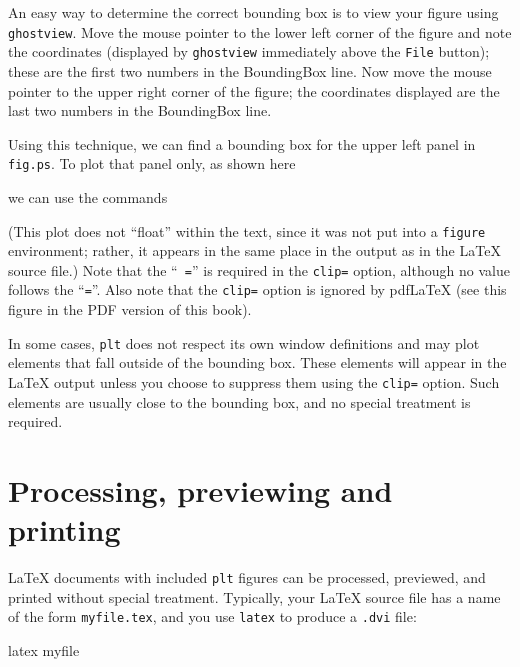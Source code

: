 \documentclass{book}
\begin{document}
%
An easy way to determine the correct bounding box is to view your figure using
{\tt ghostview}.  Move the mouse pointer to the lower left corner of the figure
and note the coordinates (displayed by {\tt ghostview} immediately above the
{\tt File} button); these are the first two numbers in the BoundingBox line.
Now move the mouse pointer to the upper right corner of the figure; the
coordinates displayed are the last two numbers in the BoundingBox line.

Using this technique, we can find a bounding box for the upper left panel in
{\tt fig.ps}.  To plot that panel only, as shown here
\begin{center}
\end{center}
we can use the commands
\begin{center}
\begin{boxedverbatim}
\begin{center}
\end{center}
\end{boxedverbatim}
\end{center}
(This plot does not ``float'' within the text, since it was not put
into a {\tt figure} environment; rather, it appears in the same place
in the output as in the \LaTeX{} source file.)  Note that the ``{\tt
=}'' is required in the {\tt clip=} option, although no value follows
the ``{\tt =}''.  Also note that the {\tt clip=} option is ignored
by pdf\LaTeX{} (see this figure in the PDF version of this book).

%
In some cases, {\tt plt} does not respect its own window definitions
and may plot elements that fall outside of the bounding box.  These elements
will appear in the \LaTeX{} output unless you choose to suppress them using
the {\tt clip=} option.  Such elements are usually close to the bounding box,
and no special treatment is required.

\section{Processing, previewing and printing \label{sec:preview-print}}

\LaTeX{} documents with included {\tt plt} figures can be processed, previewed,
and printed without special treatment.  Typically, your \LaTeX{} source file
has a name of the form {\tt myfile.tex}, and you use {\tt latex} to produce
a {\tt .dvi} file:
\begin{center}
\begin{boxedverbatim}
latex myfile
\end{boxedverbatim}
\end{center}
\end{document}
